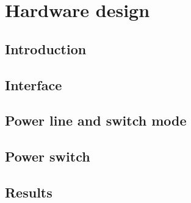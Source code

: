 \chapter{Hardware design}
\section{Introduction}
\section{Interface}
\section{Power line and switch mode}
\section{Power switch}
\section{Results}









